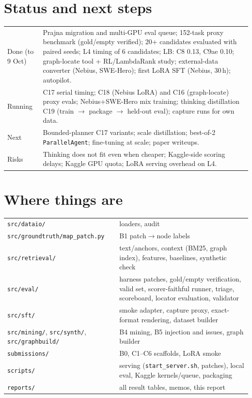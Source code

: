 \documentclass[10pt,a4paper]{article}
\newcommand{\code}[1]{\texttt{#1}}
\newcommand{\1}{\mathbb{1}}
\begin{document}
\section{Status and next steps}
\begin{table}[H]\centering\small
\begin{tabularx}{\linewidth}{lX}\toprule
Done (to 9 Oct) & Prajna migration and multi-GPU eval queue; 152-task proxy benchmark (gold/empty verified); 20+ candidates evaluated
with paired seeds; L4 timing of 6 candidates; LB: C8 0.13, C9ae 0.10; graph-locate tool + RL/LambdaRank study; external-data
converter (Nebius, SWE-Hero); first LoRA SFT (Nebius, 30\,h); autopilot. \\
Running & C17 serial timing; C18 (Nebius LoRA) and C16 (graph-locate) proxy evals; Nebius+SWE-Hero mix training; thinking
distillation C19 (train $\to$ package $\to$ held-out eval); capture runs for own data. \\
Next & Bounded-planner C17 variants; scale distillation; best-of-2 \code{ParallelAgent}; fine-tuning at scale; paper writeups. \\
Risks & Thinking does not fit even when cheaper; Kaggle-side scoring delays; Kaggle GPU quota; LoRA serving overhead on L4. \\\bottomrule
\end{tabularx}\end{table}

\appendix
\section{Where things are}
\begin{table}[H]\centering\small
\begin{tabularx}{\linewidth}{lX}\toprule
\code{src/dataio/} & loaders, audit\\
\code{src/groundtruth/map\_patch.py} & B1 patch$\to$node labels\\
\code{src/retrieval/} & text/anchors, context (BM25, graph index), features, baselines, synthetic check\\
\code{src/eval/} & harness patches, gold/empty verification, valid set, scorer-faithful runner, triage, scoreboard, locator evaluation, validator\\
\code{src/sft/} & smoke adapter, capture proxy, exact-format rendering, dataset builder\\
\code{src/mining/}, \code{src/synth/}, \code{src/graphbuild/} & B4 mining, B5 injection and issues, graph builder\\
\code{submissions/} & B0, C1--C6 scaffolds, LoRA smoke\\
\code{scripts/} & serving (\code{start\_server.sh}, patches), local eval, Kaggle kernels/queue, packaging\\
\code{reports/} & all result tables, memos, this report\\\bottomrule
\end{tabularx}\end{table}
\end{document}
